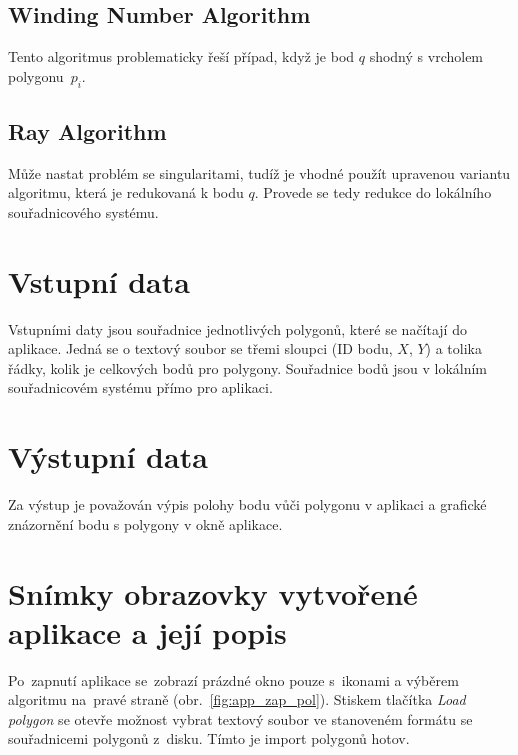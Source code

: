 \documentclass[a4paper, 12pt, oneside, titlepage]{article} %
\begin{document}
\subsection*{Winding Number Algorithm}
Tento algoritmus problematicky řeší případ, když je bod $q$ shodný s vrcholem polygonu~$p_i$.



\subsection*{Ray Algorithm}
Může nastat problém se singularitami, tudíž je vhodné použít upravenou variantu algoritmu, která je redukovaná k bodu $q$. Provede se tedy redukce do lokálního souřadnicového systému. 

\section*{Vstupní data}
Vstupními daty jsou souřadnice jednotlivých polygonů, které se načítají do aplikace. Jedná se o textový soubor se třemi sloupci (ID bodu, $X$, $Y$) a tolika řádky, kolik je celkových bodů pro polygony. Souřadnice bodů jsou v lokálním souřadnicovém systému přímo pro aplikaci.


\section*{Výstupní data}
Za výstup je považován výpis polohy bodu vůči polygonu v aplikaci a grafické znázornění bodu s polygony v okně aplikace. 

\section*{Snímky obrazovky vytvořené aplikace a její popis}
Po~zapnutí aplikace se~zobrazí prázdné okno pouze s~ikonami a výběrem algoritmu na~pravé straně (obr.~\ref{fig:app_zap_pol}). Stiskem tlačítka \emph{Load polygon} se otevře možnost vybrat textový soubor ve stanoveném formátu se souřadnicemi polygonů z~disku. Tímto je import polygonů hotov. 
\end{document}
